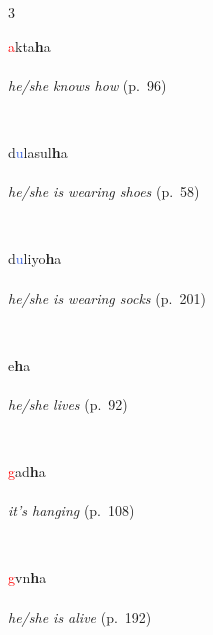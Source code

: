 \documentclass[oneside,openany]{book}%
\begin{document}
\noindent\begin{multicols}{3}%
\begin{minipage}[t]{\linewidth}
\raggedright\noindent \textcolor{Red}{a}kta\textbf{h}a\\
\\
\noindent \textit{he/she knows how} (p.~96)
\end{minipage}\\[1em]%
\begin{minipage}[t]{\linewidth}
\raggedright\noindent d\textcolor{RoyalBlue}{u}lasul\textbf{h}a\\
\\
\noindent \textit{he/she is wearing shoes} (p.~58)
\end{minipage}\\[1em]%
\begin{minipage}[t]{\linewidth}
\raggedright\noindent d\textcolor{RoyalBlue}{u}liyo\textbf{h}a\\
\\
\noindent \textit{he/she is wearing socks} (p.~201)
\end{minipage}\\[1em]%
\begin{minipage}[t]{\linewidth}
\raggedright\noindent e\textbf{h}a\\
\\
\noindent \textit{he/she lives} (p.~92)
\end{minipage}\\[1em]%
\begin{minipage}[t]{\linewidth}
\raggedright\noindent \textcolor{Red}{g}ad\textbf{h}a\\
\\
\noindent \textit{it's hanging} (p.~108)
\end{minipage}\\[1em]%
\begin{minipage}[t]{\linewidth}
\raggedright\noindent \textcolor{Red}{g}vn\textbf{h}a\\
\\
\noindent \textit{he/she is alive} (p.~192)

\end{minipage}
\end{multicols}
\end{document}
